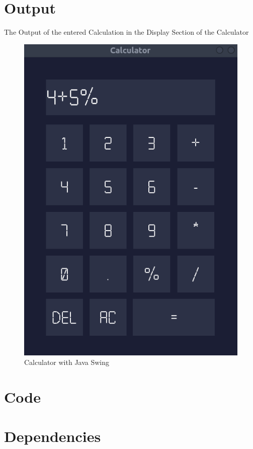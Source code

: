 \documentclass[11pt]{article}
\begin{document}
\section{Output}
The Output of the entered Calculation in the Display Section of the Calculator
\begin{figure}[H]
	\centering
	\includegraphics[scale=0.5]{Calculator.png}
	\caption{Calculator with Java Swing}
\end{figure}

\section{Code}



\section{Dependencies}

\end{document}
